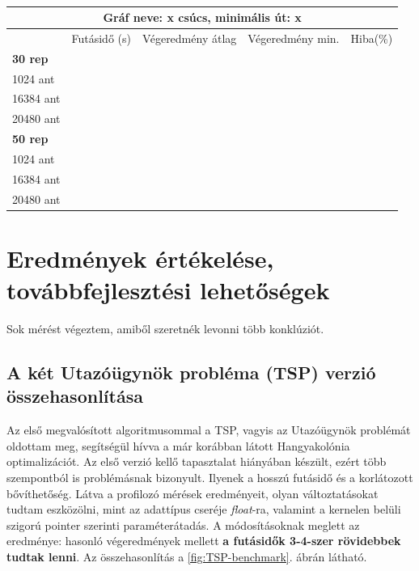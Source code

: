\begin{table}[ht!]
	\centering
	\begin{tabular}{|p{1.75cm}||p{2cm}|p{3.25cm}|p{3.25cm}|p{1.5cm}|}
		\hline
		\multicolumn{5}{|c|}{Gráf neve: x csúcs, minimális út: x} \\
		\hline
		& Futásidő (s) & Végeredmény átlag & Végeredmény min. & Hiba(\%) \\
		\hline
		\textbf{30 rep} &  &  &  &  \\
		1024 ant &  &  &  &  \\
		16384 ant & &  &  &  \\
		20480 ant &  &  &  &  \\
		\hline
		\textbf{50 rep} &  &  &  &  \\
		1024 ant &  &  &  &  \\
		16384 ant &  &  &  &  \\
		20480 ant &  &  &  &  \\
		\hline
	\end{tabular}
	\caption{}
	\label{table:VRTPW_empty}
\end{table}



\section{Eredmények értékelése, továbbfejlesztési lehetőségek} \label{results_section}
Sok mérést végeztem, amiből szeretnék levonni több konklúziót.

\subsection{A két Utazóügynök probléma (TSP) verzió összehasonlítása}

Az első megvalósított algoritmusommal a TSP, vagyis az Utazóügynök problémát oldottam meg, segítségül hívva a már korábban látott Hangyakolónia optimalizációt. Az első verzió kellő tapasztalat hiányában készült, ezért több szempontból is problémásnak bizonyult. Ilyenek a hosszú futásidő és a korlátozott bővíthetőség. Látva a profilozó mérések eredményeit, olyan változtatásokat tudtam eszközölni, mint az adattípus cseréje \textit{float}-ra, valamint a kernelen belüli szigorú pointer szerinti paraméterátadás. A módosításoknak meglett az eredménye: hasonló végeredmények mellett \textbf{a futásidők 3-4-szer rövidebbek tudtak lenni}. Az összehasonlítás a \ref{fig:TSP-benchmark}. ábrán látható.

